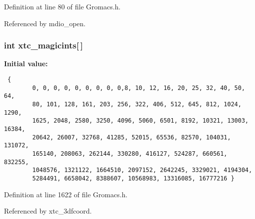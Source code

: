 Definition at line 80 of file Gromacs.h.

Referenced by mdio\_\-open.
\subsubsection{\setlength{\rightskip}{0pt plus 5cm}int xtc\_\-magicints[$\,$]\hspace{0.3cm}{\tt  [static]}}\label{Gromacs_8h_a35}


{\bf Initial value:}

\footnotesize\begin{verbatim} {
        0, 0, 0, 0, 0, 0, 0, 0, 0,8, 10, 12, 16, 20, 25, 32, 40, 50, 64,
        80, 101, 128, 161, 203, 256, 322, 406, 512, 645, 812, 1024, 1290,
        1625, 2048, 2580, 3250, 4096, 5060, 6501, 8192, 10321, 13003, 16384,
        20642, 26007, 32768, 41285, 52015, 65536, 82570, 104031, 131072,
        165140, 208063, 262144, 330280, 416127, 524287, 660561, 832255,
        1048576, 1321122, 1664510, 2097152, 2642245, 3329021, 4194304,
        5284491, 6658042, 8388607, 10568983, 13316085, 16777216 }\end{verbatim}\normalsize 


Definition at line 1622 of file Gromacs.h.

Referenced by xtc\_\-3dfcoord.